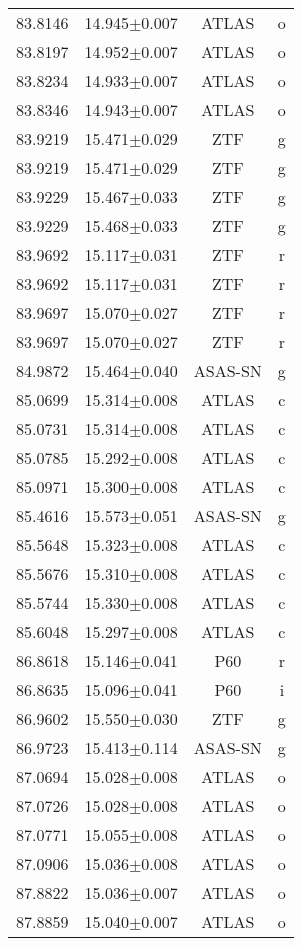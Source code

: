 \begin{table}
\begin{tabular}{cccc}
83.8146 & 14.945$\pm$0.007 & ATLAS & o \\
83.8197 & 14.952$\pm$0.007 & ATLAS & o \\
83.8234 & 14.933$\pm$0.007 & ATLAS & o \\
83.8346 & 14.943$\pm$0.007 & ATLAS & o \\
83.9219 & 15.471$\pm$0.029 & ZTF & g \\
83.9219 & 15.471$\pm$0.029 & ZTF & g \\
83.9229 & 15.467$\pm$0.033 & ZTF & g \\
83.9229 & 15.468$\pm$0.033 & ZTF & g \\
83.9692 & 15.117$\pm$0.031 & ZTF & r \\
83.9692 & 15.117$\pm$0.031 & ZTF & r \\
83.9697 & 15.070$\pm$0.027 & ZTF & r \\
83.9697 & 15.070$\pm$0.027 & ZTF & r \\
84.9872 & 15.464$\pm$0.040 & ASAS-SN & g \\
85.0699 & 15.314$\pm$0.008 & ATLAS & c \\
85.0731 & 15.314$\pm$0.008 & ATLAS & c \\
85.0785 & 15.292$\pm$0.008 & ATLAS & c \\
85.0971 & 15.300$\pm$0.008 & ATLAS & c \\
85.4616 & 15.573$\pm$0.051 & ASAS-SN & g \\
85.5648 & 15.323$\pm$0.008 & ATLAS & c \\
85.5676 & 15.310$\pm$0.008 & ATLAS & c \\
85.5744 & 15.330$\pm$0.008 & ATLAS & c \\
85.6048 & 15.297$\pm$0.008 & ATLAS & c \\
86.8618 & 15.146$\pm$0.041 & P60 & r \\
86.8635 & 15.096$\pm$0.041 & P60 & i \\
86.9602 & 15.550$\pm$0.030 & ZTF & g \\
86.9723 & 15.413$\pm$0.114 & ASAS-SN & g \\
87.0694 & 15.028$\pm$0.008 & ATLAS & o \\
87.0726 & 15.028$\pm$0.008 & ATLAS & o \\
87.0771 & 15.055$\pm$0.008 & ATLAS & o \\
87.0906 & 15.036$\pm$0.008 & ATLAS & o \\
87.8822 & 15.036$\pm$0.007 & ATLAS & o \\
87.8859 & 15.040$\pm$0.007 & ATLAS & o \\

\end{tabular}
\end{table}
